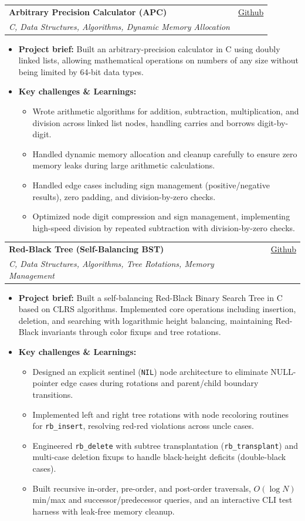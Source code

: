 \documentclass[letterpaper,11pt]{article}
\makeatletter
\newcommand{\resumeItem}[1]{
  \item
    {#1 \vspace{-2pt}}
}
\newcommand{\resumeSubheading}[4]{
  \vspace{-2pt}\item
    \begin{tabular*}{0.97\textwidth}[t]{l@{\extracolsep{\fill}}r}
      \textbf{#1} & #2 \\
      \textit{#3} & {#4} \\
    \end{tabular*}\vspace{-7pt}
}
\newcommand{\resumeItemListStart}{\begin{itemize}[topsep=2pt, itemsep=2pt, parsep=0pt]}
\newcommand{\resumeItemListEnd}{\end{itemize}\vspace{-5pt}}
\makeatother
\begin{document}
    \resumeSubheading
      {Arbitrary Precision Calculator (APC)}{\href{https://github.com/k0-R0/APC}{Github}}
      {C, Data Structures, Algorithms, Dynamic Memory Allocation}{}
      \resumeItemListStart
        \resumeItem{\textbf{Project brief:} Built an arbitrary-precision calculator in C using doubly linked lists, allowing mathematical operations on numbers of any size without being limited by 64-bit data types.}
        \resumeItem{\textbf{Key challenges \& Learnings:}}
        \resumeItemListStart
            \resumeItem{Wrote arithmetic algorithms for addition, subtraction, multiplication, and division across linked list nodes, handling carries and borrows digit-by-digit.}
            \resumeItem{Handled dynamic memory allocation and cleanup carefully to ensure zero memory leaks during large arithmetic calculations.}
            \resumeItem{Handled edge cases including sign management (positive/negative results), zero padding, and division-by-zero checks.}
            \resumeItem{Optimized node digit compression and sign management, implementing high-speed division by repeated subtraction with division-by-zero checks.}
        \resumeItemListEnd
      \resumeItemListEnd

    \resumeSubheading
      {Red-Black Tree (Self-Balancing BST)}{\href{https://github.com/k0-R0/RedBlack_Tree}{Github}}
      {C, Data Structures, Algorithms, Tree Rotations, Memory Management}{}
      \resumeItemListStart
        \resumeItem{\textbf{Project brief:} Built a self-balancing Red-Black Binary Search Tree in C based on CLRS algorithms. Implemented core operations including insertion, deletion, and searching with logarithmic height balancing, maintaining Red-Black invariants through color fixups and tree rotations.}
        \resumeItem{\textbf{Key challenges \& Learnings:}}
        \resumeItemListStart
            \resumeItem{Designed an explicit sentinel (\texttt{NIL}) node architecture to eliminate NULL-pointer edge cases during rotations and parent/child boundary transitions.}
            \resumeItem{Implemented left and right tree rotations with node recoloring routines for \texttt{rb\_insert}, resolving red-red violations across uncle cases.}
            \resumeItem{Engineered \texttt{rb\_delete} with subtree transplantation (\texttt{rb\_transplant}) and multi-case deletion fixups to handle black-height deficits (double-black cases).}
            \resumeItem{Built recursive in-order, pre-order, and post-order traversals, $O(\log N)$ min/max and successor/predecessor queries, and an interactive CLI test harness with leak-free memory cleanup.}
        \resumeItemListEnd
      \resumeItemListEnd
\end{document}
